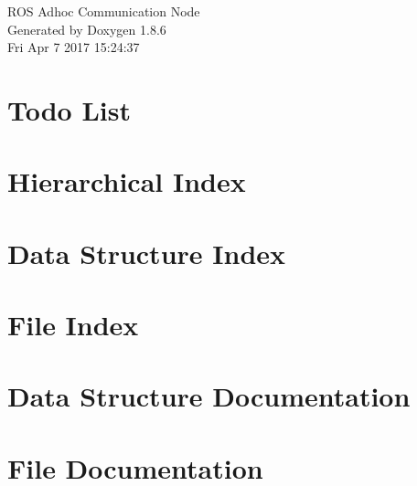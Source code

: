 \documentclass[twoside]{book}
\newcommand{\clearemptydoublepage}{%
  \newpage{\pagestyle{empty}\cleardoublepage}%
}
\begin{document}
\hypersetup{pageanchor=false}
\begin{titlepage}
\vspace*{7cm}
\begin{center}%
{\Large R\-O\-S Adhoc Communication Node }\\
\vspace*{1cm}
{\large Generated by Doxygen 1.8.6}\\
\vspace*{0.5cm}
{\small Fri Apr 7 2017 15:24:37}\\
\end{center}
\end{titlepage}
\clearemptydoublepage
\tableofcontents
\clearemptydoublepage
{}
\hypersetup{pageanchor=true}

\chapter{Todo List}
\label{todo}
\hypertarget{todo}{}

\chapter{Hierarchical Index}

\chapter{Data Structure Index}

\chapter{File Index}

\chapter{Data Structure Documentation}














































\chapter{File Documentation}




\newpage
{}
{}
\printindex
\end{document}
